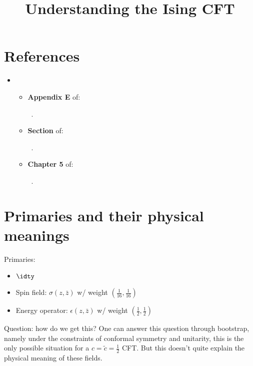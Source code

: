 \documentclass[a4paper
	,10pt
]{article}
\title{Understanding the Ising CFT}
\begin{document}
\maketitle
{}
\thispagestyle{empty}


\setlength{\parskip}{.1\baselineskip}
\tableofcontents
\setlength{\parskip}{\parskipnorm}

\addtocounter{section}{-1}
\section{References}
\raggedright
	\begin{itemize}
	\item \cite{Atanasov:2017abc}~
		\begin{itemize}
		\item \textbf{Appendix E} of: \par
		\cite{Belavin:1984vu}~.
		
		\item \textbf{Section } of: \par
		\cite{Kogut:1979wt}~.
		
		\item \textbf{Chapter 5} of:\par
		\cite{Fradkin:1991nr}~.
		
		\end{itemize}
	\end{itemize}
\justifying

\section{Primaries and their physical meanings}
	Primaries:
	\begin{itemize}[noitemsep]
	\item $\idty$
	\item Spin field: $\sigma(z,\bar{z})$ w/ weight $(\frac{1}{16},\frac{1}{16})$
	\item Energy operator: $\epsilon(z,\bar{z})$ w/ weight $(\frac{1}{2},\frac{1}{2})$
	\end{itemize}
	Question: how do we get this?
	One can answer this question through bootstrap, namely under the constraints of conformal symmetry and unitarity, this is the only possible situation for a $c = \tilde{c} = \frac{1}{2}$ CFT. But this doesn't quite explain the physical meaning of these fields. 
	
\end{document}
